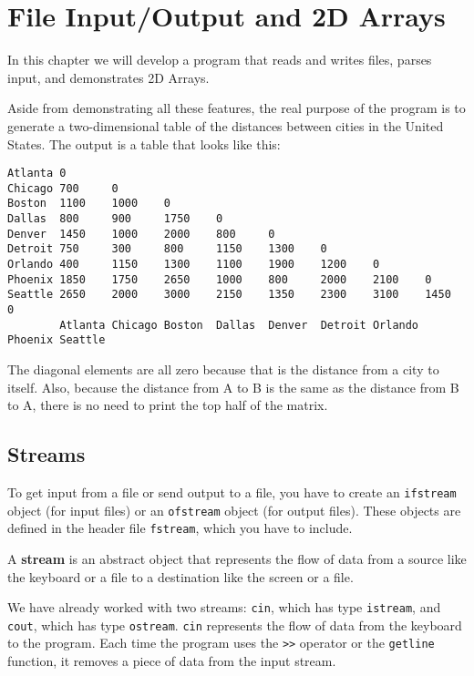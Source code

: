 

\chapter{File Input/Output and 2D Arrays}

In this chapter we will develop a program that reads and writes files,
parses input, and demonstrates 2D Arrays.  

Aside from demonstrating all these features, the real purpose of the
program is to generate a two-dimensional table of
the distances between cities in the United States.
The output is a table that looks like this:

\begin{verbatim}
Atlanta 0
Chicago 700     0
Boston  1100    1000    0
Dallas  800     900     1750    0
Denver  1450    1000    2000    800     0
Detroit 750     300     800     1150    1300    0
Orlando 400     1150    1300    1100    1900    1200    0
Phoenix 1850    1750    2650    1000    800     2000    2100    0
Seattle 2650    2000    3000    2150    1350    2300    3100    1450    0
        Atlanta Chicago Boston  Dallas  Denver  Detroit Orlando Phoenix Seattle
\end{verbatim}
%
The diagonal elements are all zero because that is the distance
from a city to itself.  Also, because
the distance from A to B is the same as the distance from B
to A, there is no need to print the top half of the matrix.

\section {Streams}

To get input from a file or send output to a file, you have to
create an {\tt ifstream} object (for input files) or an
{\tt ofstream} object (for output files).  These objects
are defined in the header file {\tt fstream}, which you
have to include.


A {\bf stream} is an abstract object that represents the flow
of data from a source like the keyboard or a file to a destination
like the screen or a file.

We have already worked with two streams: {\tt cin}, which has type
{\tt istream}, and {\tt cout}, which has type {\tt ostream}.
{\tt cin} represents the flow of data from the keyboard to
the program.  Each time the program uses the {\tt >>} operator
or the {\tt getline} function, it removes a piece of data
from the input stream.

